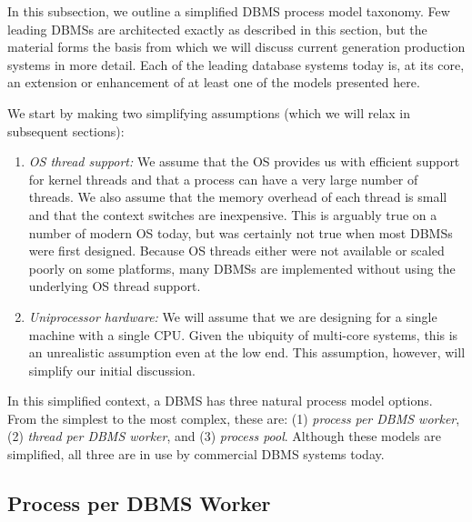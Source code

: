 \documentclass[a4paper,11pt,twoside,openright]{book}
\begin{document}
In this subsection, we outline a simplified DBMS process model taxonomy.
Few leading DBMSs are architected exactly as described in this section,
but the material forms the basis from which we will discuss current
generation production systems in more detail. Each of the leading
database systems today is, at its core, an extension or enhancement of
at least one of the models presented here.

We start by making two simplifying assumptions (which we will relax in
subsequent sections):

\begin{enumerate}
\def\labelenumi{\arabic{enumi}.}
\item
  \emph{OS thread support:} We assume that the OS provides us with
  efficient support for kernel threads and that a process can have a
  very large number of threads. We also assume that the memory overhead
  of each thread is small and that the context switches are inexpensive.
  This is arguably true on a number of modern OS today, but was
  certainly not true when most DBMSs were first designed. Because OS
  threads either were not available or scaled poorly on some platforms,
  many DBMSs are implemented without using the underlying OS thread
  support.
\item
  \emph{Uniprocessor hardware:} We will assume that we are designing for
  a single machine with a single CPU. Given the ubiquity of multi-core
  systems, this is an unrealistic assumption even at the low end. This
  assumption, however, will simplify our initial discussion.
\end{enumerate}

In this simplified context, a DBMS has three natural process model
options. From the simplest to the most complex, these are: (1)
\emph{process} \emph{per DBMS worker}, (2) \emph{thread per DBMS
worker}, and (3) \emph{process pool}. Although these models are
simplified, all three are in use by commercial DBMS systems today.

\hypertarget{process-per-dbms-worker}{%
\subsection{Process per DBMS
Worker}\label{process-per-dbms-worker}}
\end{document}
